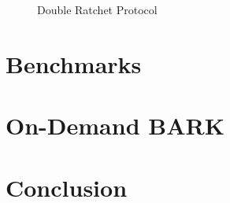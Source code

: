 \documentclass[11pt,a4paper,twoside,openright,bibliography=totoc]{scrbook}
\begin{document}
\begin{figure}[ht]
  \centering
  \setlength{\fboxsep}{10pt}
  \scalebox{0.9}{%
    \fbox{%
      
    }
  }
  \caption{Double Ratchet Protocol}
  \label{fig:double-ratchet}
\end{figure}

\chapter{Benchmarks}
\label{chap:benchmarks}

\chapter{On-Demand BARK}
\label{chap:bark}

\chapter{Conclusion}
\label{chap:conclusion}





\listoffigures
\end{document}
